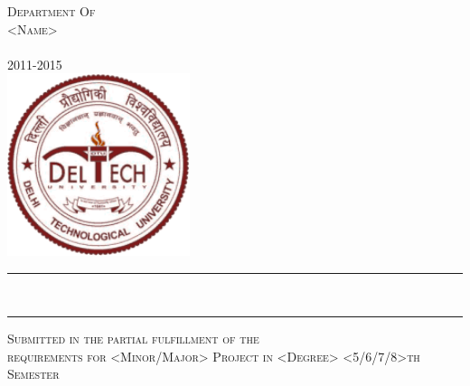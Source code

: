 
\begin{titlepage}
\begin{center}

\textsc{\LARGE Department Of}\\[0.5cm]
\textsc{\LARGE <Name>}\\[1.0cm]
\textsc{}\\[1.0cm]
\textsc{\LARGE 2011-2015}\\[1.0cm]

\includegraphics[width=0.4\textwidth]{../Figures/logo}~\\[1cm]

\hrule \vspace{0.3cm}
{ \huge \bfseries <Project Title>\\[0.4cm] }
\hrule \vspace{1.0cm}

\textsc{Submitted in the partial fulfillment of the}\\[0.2cm]
\textsc{requirements for <Minor/Major> Project in <Degree> <5/6/7/8>th Semester}\\[0.2cm]

\vspace{0.3cm}


\end{center}
\end{titlepage}

